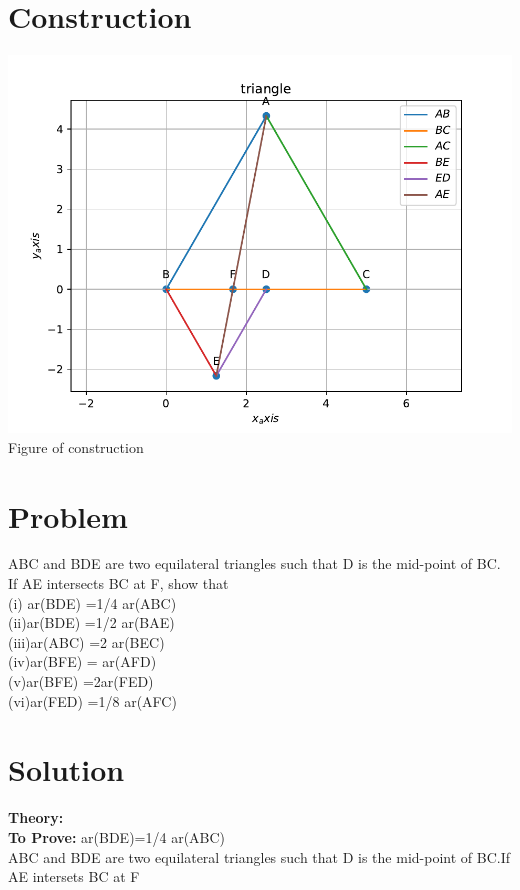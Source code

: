 \documentclass[10pt, a4paper]{article}
\title{\mytitle}
\author{\myauthor\hspace{1em}\\\contact\\FWC22040\hspace{6.5em}IITH\hspace{0.5em}\mymodule\hspace{6em}ASSIGN-5}
\date{}
\begin{document}
 \maketitle
 \tableofcontents
\section{Construction}                                                                    \begin{center}
  \includegraphics[scale=0.39]{par.pdf}
\\  Figure of construction
   \end{center}
   \section{Problem}
  ABC and BDE are two equilateral
triangles such that D is the mid-point of BC. If AE
intersects BC at F, show that\\
(i) ar(BDE) =1/4 ar(ABC)\\
(ii)ar(BDE) =1/2 ar(BAE)\\
(iii)ar(ABC) =2 ar(BEC)\\
(iv)ar(BFE) = ar(AFD)\\
(v)ar(BFE) =2ar(FED)\\
(vi)ar(FED) =1/8 ar(AFC)

   \section{Solution}
   \textbf{Theory:}\\
   \textbf{To Prove:} ar(BDE)=1/4 ar(ABC) \\
   ABC and BDE are two equilateral triangles such that D is the mid-point of BC.If AE intersets BC at F
\end{document}
